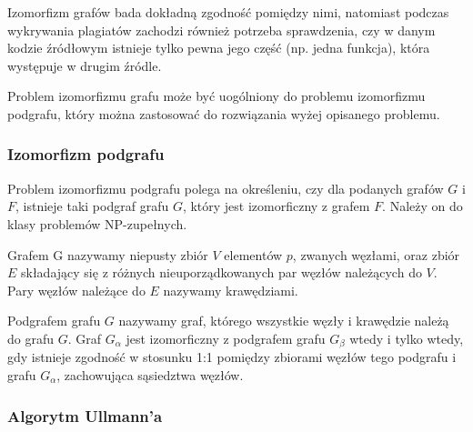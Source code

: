 \documentclass[a4paper,12pt]{article}
\begin{document}
Izomorfizm grafów bada dokładną zgodność pomiędzy nimi, natomiast podczas wykrywania plagiatów zachodzi również potrzeba sprawdzenia, czy w danym kodzie źródłowym istnieje tylko pewna jego część (np. jedna funkcja), która występuje w drugim źródle.

Problem izomorfizmu grafu może być uogólniony do problemu izomorfizmu podgrafu, który można zastosować do rozwiązania wyżej opisanego problemu.

\pagebreak

\subsubsection{Izomorfizm podgrafu} 

Problem izomorfizmu podgrafu polega na określeniu, czy dla podanych grafów $G$ i $F$, istnieje taki podgraf grafu $G$, który jest izomorficzny z grafem $F$. Należy on do klasy problemów NP-zupełnych.

Grafem G nazywamy niepusty zbiór $V$ elementów $p$, zwanych węzłami, oraz zbiór $E$ składający się z różnych nieuporządkowanych par węzłów należących do $V$. Pary węzłów należące do $E$ nazywamy krawędziami.

Podgrafem grafu $G$ nazywamy graf, którego wszystkie węzły i krawędzie należą do grafu $G$. Graf $G_\alpha$ jest izomorficzny z podgrafem grafu $G_\beta$ wtedy i tylko wtedy, gdy istnieje zgodność w stosunku 1:1 pomiędzy zbiorami węzłów tego podgrafu i grafu $G_\alpha$, zachowująca sąsiedztwa węzłów\cite{ullmann}.

\subsubsection{Algorytm Ullmann'a}
\end{document}
